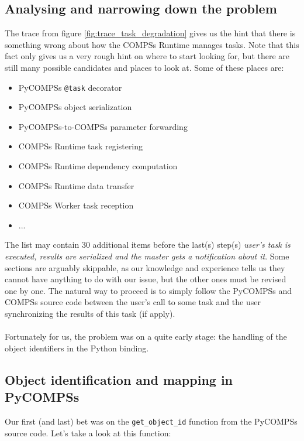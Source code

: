 \subsection{Analysing and narrowing down the problem}
The trace from figure \ref{fig:trace_task_degradation} gives us the hint that there is something wrong about how the COMPSs Runtime manages tasks. Note that this fact only gives us a very rough hint on where to start looking for, but there are still many possible candidates and places to look at. Some of these places are:
\begin{itemize}
\item PyCOMPSs \verb|@task| decorator
\item PyCOMPSs object serialization
\item PyCOMPSs-to-COMPSs parameter forwarding
\item COMPSs Runtime task registering
\item COMPSs Runtime dependency computation
\item COMPSs Runtime data transfer
\item COMPSs Worker task reception
\item ...
\end{itemize}
The list may contain 30 additional items before the last(s) step(s) \textit{user's task is executed, results are serialized and the master gets a notification about it}. Some sections are arguably skippable, as our knowledge and experience tells us they cannot have anything to do with our issue, but the other ones must be revised one by one. The natural way to proceed is to simply follow the PyCOMPSs and COMPSs source code between the user's call to some task and the user synchronizing the results of this task (if apply).\\
\\
Fortunately for us, the problem was on a quite early stage: the handling of the object identifiers in the Python binding.

\subsection{Object identification and mapping in PyCOMPSs}
Our first (and last) bet was on the \verb|get_object_id| function from the PyCOMPSs source code. Let's take a look at this function:

\inputminted{python}{snippets/get_object_id_old.py}

